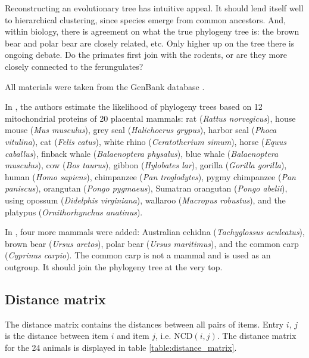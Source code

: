 Reconstructing an evolutionary tree has intuitive appeal. It should lend
itself well to hierarchical clustering, since species emerge from common
ancestors. And, within biology, there is agreement on what the true
phylogeny tree is: the brown bear and polar bear are closely related, etc.
Only higher up on the tree there is ongoing debate. Do the primates first
join with the rodents, or are they more closely connected to the
ferungulates?

All materials were taken from the GenBank database \cite{GenBank}.

In \cite{Cao1998}, the authors estimate the likelihood of phylogeny trees
based on 12 mitochondrial proteins of 20 placental mammals: rat
(\emph{Rattus norvegicus}), house mouse (\emph{Mus musculus}), grey seal
(\emph{Halichoerus grypus}), harbor seal (\emph{Phoca vitulina}), cat
(\emph{Felis catus}), white rhino (\emph{Ceratotherium simum}), horse
(\emph{Equus caballus}), finback whale (\emph{Balaenoptera physalus}),
blue whale (\emph{Balaenoptera musculus}), cow (\emph{Bos taurus}), gibbon
(\emph{Hylobates lar}), gorilla (\emph{Gorilla gorilla}), human
(\emph{Homo sapiens}), chimpanzee (\emph{Pan troglodytes}), pygmy
chimpanzee (\emph{Pan paniscus}), orangutan (\emph{Pongo pygmaeus}),
Sumatran orangutan (\emph{Pongo abelii}), using opossum (\emph{Didelphis
virginiana}), wallaroo (\emph{Macropus robustus}), and the platypus
(\emph{Ornithorhynchus anatinus}).

In \cite{Cilibrasi2005}, four more mammals were added: Australian echidna
(\emph{Tachyglossus aculeatus}), brown bear (\emph{Ursus arctos}), polar
bear (\emph{Ursus maritimus}), and the common carp (\emph{Cyprinus
carpio}). The common carp is not a mammal and is used as an outgroup. It
should join the phylogeny tree at the very top.

\subsection{Distance matrix}

The distance matrix contains the distances between all pairs of items.
Entry $i$, $j$ is the distance between item $i$ and item $j$, i.e.
$\text{NCD}(i, j)$. The distance matrix for the 24 animals is displayed in
table \ref{table:distance_matrix}.

